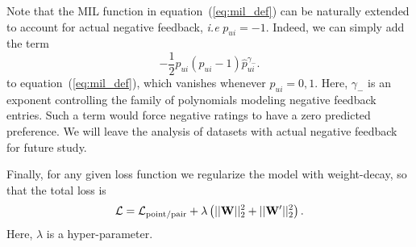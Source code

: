 Note that the MIL function in equation~(\ref{eq:mil_def}) can be naturally extended to account for actual negative feedback, \emph{i.e} $p_{ui}=-1$. Indeed, we can simply add the term 
\begin{equation}\label{eq:neg_feedback_term}
    -\frac{1}{2} p_{ui} (p_{ui}-1) \hat{p}_{ui}^{\gamma_{-}}. 
\end{equation}
to equation~(\ref{eq:mil_def}), which vanishes whenever $p_{ui}=0,1$.
Here, $\gamma_{-}$ is an exponent controlling the family of polynomials modeling negative feedback entries. Such a term would force negative ratings to have a zero predicted preference. 
We will leave the analysis of datasets with actual negative feedback for future study.

Finally, for any given loss function we regularize the model with weight-decay, so that the total loss is 
\begin{equation}\label{eq:L2_reg}
\mathcal{L} = \mathcal{L}_{\rm point/pair}+\lambda\left( ||{\bf W}||_2^2+||{\bf W'}||_2^2\right).
\end{equation}
Here, $\lambda$ is a hyper-parameter. 









